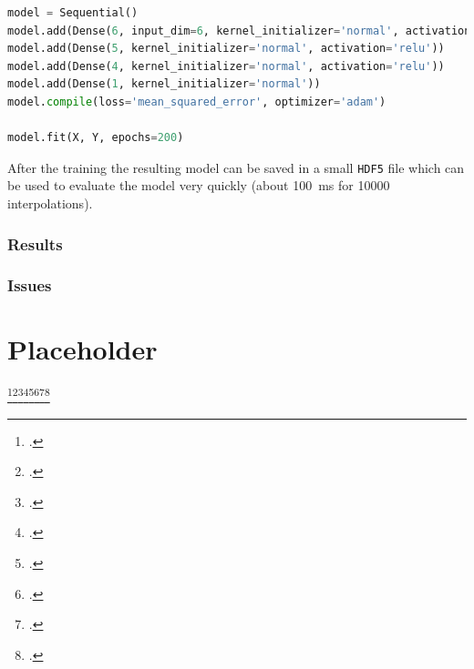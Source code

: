 \begin{lstlisting}[language=Python]
model = Sequential()
model.add(Dense(6, input_dim=6, kernel_initializer='normal', activation='relu'))
model.add(Dense(5, kernel_initializer='normal', activation='relu'))
model.add(Dense(4, kernel_initializer='normal', activation='relu'))
model.add(Dense(1, kernel_initializer='normal'))
model.compile(loss='mean_squared_error', optimizer='adam')

model.fit(X, Y, epochs=200)
\end{lstlisting}



After the training the resulting model can be saved in a small \texttt{HDF5} file which can be used to evaluate the model very quickly (about \SI{100}{\milli\second} for \num{10000} interpolations).


\subsection{Results}

\subsection{Issues}

\appendix
\chapter{Placeholder}

\lipsum[1]\footcite{Schaefer2016}\footcite{dvorakMoon}\footcite{MaindlSummary,CollisionParameters}\footcite{Burger2018}\footcite{Dorninger}\footcite{CollisionParameters}\footcite{CollisionTypes}\footcite{RBF}
\nocite{*}

\printbibliography





